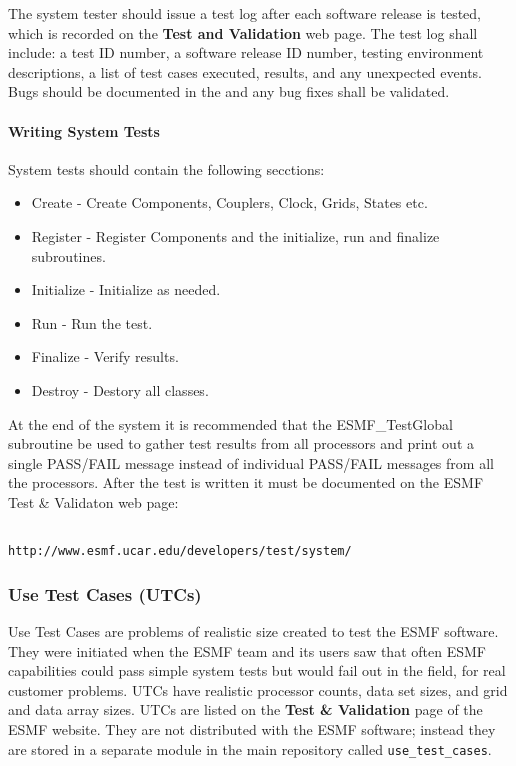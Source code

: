 The system tester should issue a test log after each software release is tested,
which is recorded on the {\bf Test and Validation} web page. The test 
log shall
include: a test ID number, a software release ID number, testing environment 
descriptions, a list of test cases executed, results, and any unexpected 
events. Bugs should be documented in the  and 
any bug fixes shall be validated.

\paragraph{Writing System Tests}

System tests should contain the following secctions:
\begin{itemize}
\item Create - Create Components, Couplers, Clock, Grids, States etc.
\item Register - Register Components and the initialize, run and finalize subroutines.
\item Initialize - Initialize as needed.
\item Run - Run the test.
\item Finalize - Verify results.
\item Destroy - Destory all classes.
\end{itemize}

At the end of the system it is recommended that the ESMF\_TestGlobal subroutine be used to gather
test results from all processors and print out a single PASS/FAIL message instead
of individual PASS/FAIL messages from all the processors.
After the test is written it must be documented on the ESMF Test \& Validaton
web page:

\begin{verbatim}

http://www.esmf.ucar.edu/developers/test/system/

\end{verbatim}


\subsubsection{Use Test Cases (UTCs)}

Use Test Cases are problems of realistic size created to test the ESMF
software.  They were initiated when the ESMF team and its users saw that
often ESMF capabilities could pass simple system tests but would fail
out in the field, for real customer problems.  UTCs have realistic
processor counts, data set sizes, and grid and data array sizes.  UTCs are
listed on the {\bf Test \& Validation} page of the ESMF website.  They
are not distributed with the ESMF software; instead they are stored in
a separate module in the main repository called {\tt use\_test\_cases}.


